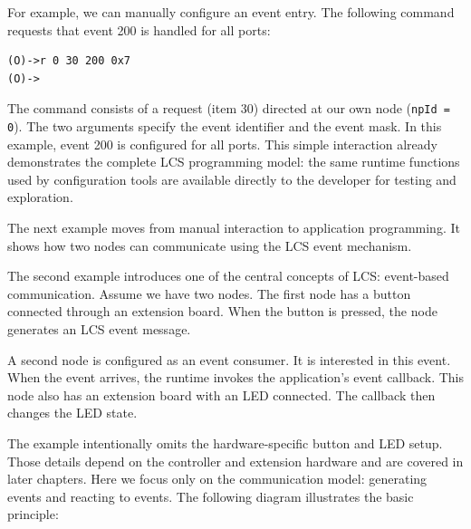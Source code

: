 For example, we can manually configure an event entry. The following command
requests that event 200 is handled for all ports:

\begin{lstlisting}[style=codesnippetstyle]
(O)->r 0 30 200 0x7
(O)->
\end{lstlisting}

The command consists of a request (item 30) directed at our own node
(\texttt{npId = 0}). The two arguments specify the event identifier and the
event mask. In this example, event 200 is configured for all ports.
This simple interaction already demonstrates the complete LCS programming model:
the same runtime functions used by configuration tools are available directly
to the developer for testing and exploration.

The next example moves from manual interaction to application programming. It
shows how two nodes can communicate using the LCS event mechanism.


The second example introduces one of the central concepts of LCS: event-based
communication.
Assume we have two nodes. The first node has a button connected through an
extension board. When the button is pressed, the node generates an LCS event
message.

A second node is configured as an event consumer. It is interested in this
event. When the event arrives, the runtime invokes the application's event
callback. This node also has an extension board with an LED connected. The
callback then changes the LED state.

The example intentionally omits the hardware-specific button and LED setup.
Those details depend on the controller and extension hardware and are covered
in later chapters. Here we focus only on the communication model: generating
events and reacting to events.
The following diagram illustrates the basic principle:

